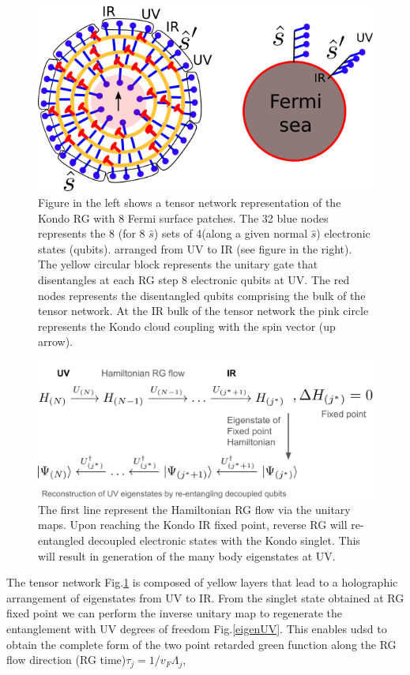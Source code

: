 \documentclass[aps,prl,preprint,groupedaddress]{revtex4-2}
\begin{document}
\begin{figure}
\includegraphics[scale=1]{TNKondo.png}
\caption{Figure in the left shows a tensor network representation of the Kondo RG with  8 Fermi surface patches. The 32 blue nodes represents the 8 (for 8 $\hat{s}$) sets of 4(along a given normal $\hat{s}$) electronic states (qubits).  arranged from UV to IR (see figure in the right). The yellow circular block represents the unitary gate that disentangles at each RG step 8 electronic qubits at UV. The red nodes represents the disentangled qubits comprising the bulk of the tensor network. At the IR bulk of the tensor network the pink circle represents the Kondo cloud coupling with the spin vector (up arrow).} \label{KondoTN}
\end{figure}
\begin{figure}
\includegraphics[width=\textwidth]{flowChart.png}
\caption{The first line represent the Hamiltonian RG flow via the unitary maps. Upon reaching the Kondo IR fixed point, reverse RG will re-entangled decoupled electronic states with the Kondo singlet. This will result in generation of the many body eigenstates at UV.}  \label{eigenUV}
\end{figure}
The tensor network Fig.\ref{KondoTN} is composed of yellow layers that lead to a holographic arrangement of eigenstates from UV to IR. From the singlet state obtained at RG fixed point we can perform the inverse unitary map to regenerate the entanglement with UV degrees of freedom Fig.\eqref{eigenUV}. This enables udsd to obtain the complete form of the two point retarded green function along the RG flow direction (RG time)$\tau_{j}=1/v_{F}\Lambda_{j}$,
\end{document}
